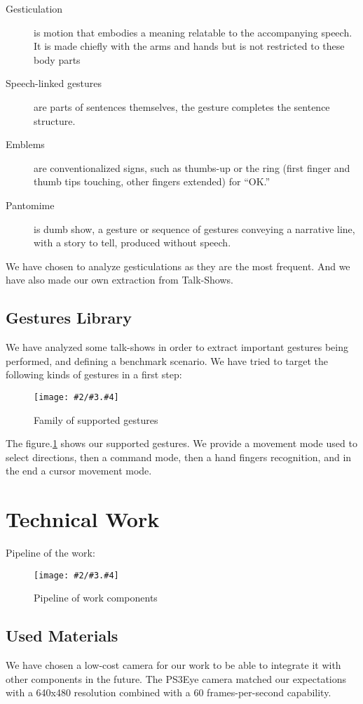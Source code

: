 \documentclass{llncs}
\newcommand\ignore[1]{}
\newcommand{\imagepathext}[5]{%
\begin{figure}[hbtp]
\hfil\texttt{[image: \#2/\#3.\#4]}\hfil
\caption{#5\label{#3}}
\end{figure}}
\newcommand{\png}[2]{\imagepathext{width=\columnwidth}{pics}{#1}{png}{#2}}
\begin{document}
\begin{description}
 \item[Gesticulation] is motion that embodies a meaning relatable to the
accompanying speech. It is made chiefly with the arms and hands but is not
restricted to these body parts
 \item[Speech-linked gestures] are parts of sentences themselves, the gesture completes the sentence structure.
 \item[Emblems] are conventionalized signs, such as thumbs-up or the ring (first
finger and thumb tips touching, other fingers extended) for ``OK.''
 \item[Pantomime] is dumb show, a gesture or sequence of gestures conveying a
narrative line, with a story to tell, produced without speech.
\end{description}


We have chosen to analyze gesticulations as they are the most frequent.
And we have also made our own extraction from Talk-Shows.


\subsection{Gestures Library}
We have analyzed some talk-shows in order to extract important gestures being performed, and defining a benchmark scenario. 
We have tried to target the following kinds of gestures in a first step:

\png{handg}{Family of supported gestures}

The figure.\ref{handg} shows our supported gestures. We provide a movement mode
used to select directions, then a command mode, then a hand fingers recognition,
and in the end a cursor movement mode.

\ignore{
Explanation of the figures
Steps for skin-color based gesture detection
}

\newpage
\section{Technical Work}
Pipeline of the work:
\png{pipeline}{Pipeline of work components}

\subsection{Used Materials}
We have chosen a low-cost camera for our work to be able to integrate it with other components in the future.
The PS3Eye camera matched our expectations with a 640x480 resolution combined with a 60 frames-per-second capability.
\end{document}
